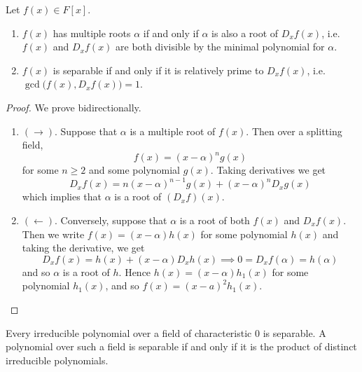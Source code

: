   \begin{theorem}
    Let $f(x) \in F[x]$. 
    \begin{enumerate}
      \item $f(x)$ has multiple roots $\alpha$ if and only if $\alpha$ is also a root of $D_x f(x)$, i.e. $f(x)$ and $D_x f(x)$ are both divisible by the minimal polynomial for $\alpha$. 
      \item $f(x)$ is separable if and only if it is relatively prime to $D_x f(x)$, i.e. $\gcd\big( f(x), D_x f(x) \big) = 1$. 
    \end{enumerate}
  \end{theorem}
  \begin{proof}
    We prove bidirectionally. 
    \begin{enumerate}
      \item $(\rightarrow)$. Suppose that $\alpha$ is a multiple root of $f(x)$. Then over a splitting field, 
      \begin{equation}
        f(x) = (x - \alpha)^n g(x)
      \end{equation}
      for some $n \geq 2$ and some polynomial $g(x)$. Taking derivatives we get 
      \begin{equation}
        D_x f(x) = n (x - \alpha)^{n-1} g(x) + (x - \alpha)^n D_x g(x) 
      \end{equation}
      which implies that $\alpha$ is a root of $(D_x f)(x)$. 

      \item $(\leftarrow)$. Conversely, suppose that $\alpha$ is a root of both $f(x)$ and $D_x f(x)$. Then we write $f(x) = (x - \alpha) h(x)$ for some polynomial $h(x)$ and taking the derivative, we get 
        \begin{equation}
          D_x f(x) = h(x) + (x - \alpha) D_x h(x) \implies 0 = D_x f(\alpha) = h(\alpha)
        \end{equation} 
        and so $\alpha$ is a root of $h$. Hence $h(x) = (x - \alpha) h_1 (x)$ for some polynomial $h_1 (x)$, and so $f(x) = (x - a)^2 h_1 (x)$. 
    \end{enumerate}
  \end{proof}

  \begin{corollary}
    Every irreducible polynomial over a field of characteristic $0$ is separable. A polynomial over such a field is separable if and only if it is the product of distinct irreducible polynomials. 
  \end{corollary}

